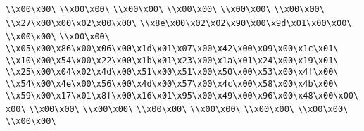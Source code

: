 \verb|\\x00\x00\|\newline
\verb|\\x00\x00\|\newline
\verb|\\x00\x00\|\newline
\verb|\\x00\x00\|\newline
\verb|\\x00\x00\|\newline
\verb|\\x00\x00\|\newline
\verb|\\x27\x00\x00\x02\x00\x00\|\newline
\verb|\\x8e\x00\x02\x02\x90\x00\x9d\x01\x00\x00\|\newline
\verb|\\x00\x00\|\newline
\verb|\\x00\x00\|\newline
\verb|\\x05\x00\x86\x00\x06\x00\x1d\x01\x07\x00\x42\x00\x09\x00\x1c\x01\|\newline
\verb|\\x10\x00\x54\x00\x22\x00\x1b\x01\x23\x00\x1a\x01\x24\x00\x19\x01\|\newline
\verb|\\x25\x00\x04\x02\x4d\x00\x51\x00\x51\x00\x50\x00\x53\x00\x4f\x00\|\newline
\verb|\\x54\x00\x4e\x00\x56\x00\x4d\x00\x57\x00\x4c\x00\x58\x00\x4b\x00\|\newline
\verb|\\x59\x00\x17\x01\x8f\x00\x16\x01\x95\x00\x49\x00\x96\x00\x48\x00\x00\x00\|\newline
\verb|\\x00\x00\|\newline
\verb|\\x00\x00\|\newline
\verb|\\x00\x00\|\newline
\verb|\\x00\x00\|\newline
\verb|\\x00\x00\|\newline
\verb|\\x00\x00\|\newline
\verb|\\x00\x00\|\newline
